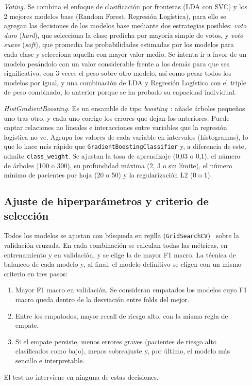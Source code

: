 \documentclass[journal,onecolumn]{IEEEtran}
\begin{document}
\textit{Voting.} Se combina el enfoque de clasificación por fronteras (LDA con SVC)
y los 2 mejores modelos base (Random Forest, Regresión Logística), para ello se agregan las decisiones 
de los modelos base mediante dos estrategias posibles: \textit{voto duro} (\textit{hard}),
que selecciona la clase predicha por mayoría simple de votos, y \textit{voto suave} (\textit{soft}),
que promedia las probabilidades estimadas por los modelos para cada clase y selecciona aquella con mayor valor medio.
Se intenta ir a favor de un modelo pesándolo con un valor considerable frente a los demás para que sea significativo, 
con 3 veces el peso sobre otro modelo, así como pesar todos los modelos por igual, 
y una combinación de LDA y Regresión Logística con el triple de peso combinado, lo anterior porque se ha probado su capacidad individual.

\textit{HistGradientBoosting.} Es un ensamble de tipo \textit{boosting}~\cite{tema2,nb_ensambles}:
añade árboles pequeños uno tras otro, y cada uno corrige los errores que dejan los anteriores.
Puede captar relaciones no lineales e interacciones entre variables que la regresión logística no ve.
Agrupa los valores de cada variable en intervalos (histogramas), lo que lo hace más rápido que
\texttt{GradientBoostingClassifier} y, a diferencia de este, admite \texttt{class\_weight}.
Se ajustan la tasa de aprendizaje (0,03 o 0,1), el número de árboles (100 o 300), su profundidad
máxima (2, 3 o sin límite), el número mínimo de pacientes por hoja (20 o 50) y la regularización L2
(0 o 1).

\subsection{Ajuste de hiperparámetros y criterio de selección}\label{sec:ajuste}
Todos los modelos se ajustan con búsqueda en rejilla (\texttt{GridSearchCV})~\cite{nb_metricas}
sobre la validación cruzada.
En cada combinación se calculan todas las métricas, en entrenamiento y en validación, y se elige la
de mayor F1 macro.
La técnica de balanceo de cada modelo y, al final, el modelo definitivo se eligen con un mismo
criterio en tres pasos:
\begin{enumerate}
\item Mayor F1 macro en validación. Se consideran empatados los modelos cuyo F1 macro queda dentro de
la desviación entre folds del mejor.
\item Entre los empatados, mayor recall de riesgo alto, con la misma regla de empate.
\item Si el empate persiste, menos errores graves (pacientes de riesgo alto clasificados como bajo),
menos sobreajuste y, por último, el modelo más sencillo e interpretable.
\end{enumerate}
El test no interviene en ninguna de estas decisiones.
\end{document}
